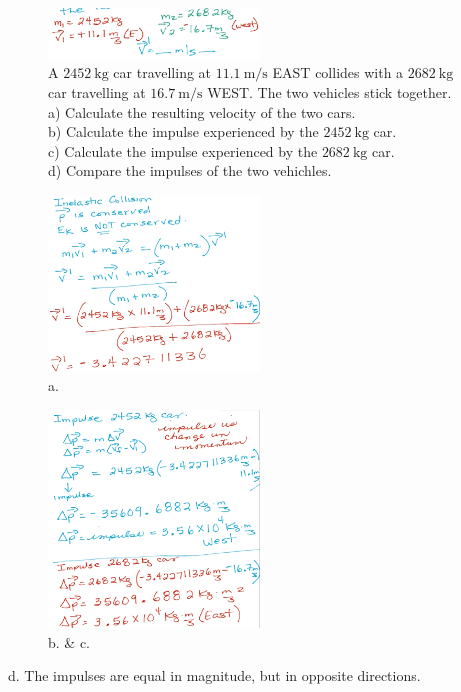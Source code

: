 \documentclass[a4paper,12pt]{article}
\begin{document}
\begin{figure}[H]
    \centering
    \caption{A $\SI{2452}{\kg}$ car travelling at $\SI{11.1}{\m/\s}$ EAST collides with a $\SI{2682}{\kg}$ car travelling at $\SI{16.7}{\m/\s}$ WEST. The two vehicles stick together. \\a) Calculate the resulting velocity of the two cars. \\b) Calculate the impulse experienced by the $\SI{2452}{\kg}$ car. \\c) Calculate the impulse experienced by the $\SI{2682}{\kg}$ car. \\d) Compare the impulses of the two vehichles.}
    \includegraphics[width=0.5\textwidth]{q-inelastic-2}
\end{figure}
\begin{figure}[H]
    \centering
    \caption{a.}
    \includegraphics[width=0.50\textwidth]{q-inelastic-2b}
\end{figure}
\begin{figure}[H]
    \centering
    \caption{b. \& c.}
    \includegraphics[width=0.50\textwidth]{q-inelastic-2c}
\end{figure}
d. The impulses are equal in magnitude, but in opposite directions.
\end{document}
